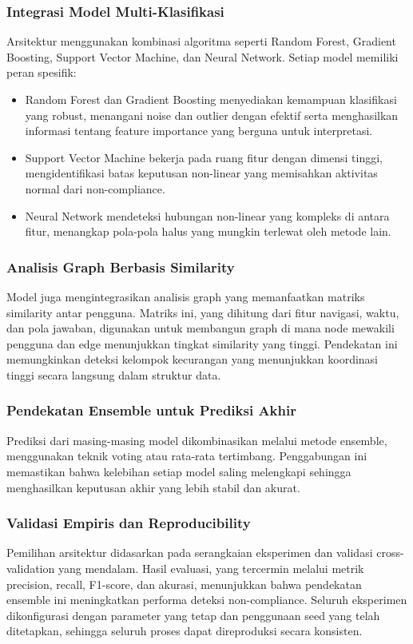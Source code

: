\subsubsection{Integrasi Model Multi-Klasifikasi}
Arsitektur menggunakan kombinasi algoritma seperti Random Forest, Gradient Boosting, Support Vector Machine, dan Neural Network. Setiap model memiliki peran spesifik:
\begin{itemize}
    \item Random Forest dan Gradient Boosting menyediakan kemampuan klasifikasi yang robust, menangani noise dan outlier dengan efektif serta menghasilkan informasi tentang feature importance yang berguna untuk interpretasi.
    \item Support Vector Machine bekerja pada ruang fitur dengan dimensi tinggi, mengidentifikasi batas keputusan non-linear yang memisahkan aktivitas normal dari non-compliance.
    \item Neural Network mendeteksi hubungan non-linear yang kompleks di antara fitur, menangkap pola-pola halus yang mungkin terlewat oleh metode lain.
\end{itemize}

\subsubsection{Analisis Graph Berbasis Similarity}
Model juga mengintegrasikan analisis graph yang memanfaatkan matriks similarity antar pengguna. Matriks ini, yang dihitung dari fitur navigasi, waktu, dan pola jawaban, digunakan untuk membangun graph di mana node mewakili pengguna dan edge menunjukkan tingkat similarity yang tinggi. Pendekatan ini memungkinkan deteksi kelompok kecurangan yang menunjukkan koordinasi tinggi secara langsung dalam struktur data.

\subsubsection{Pendekatan Ensemble untuk Prediksi Akhir}
Prediksi dari masing-masing model dikombinasikan melalui metode ensemble, menggunakan teknik voting atau rata-rata tertimbang. Penggabungan ini memastikan bahwa kelebihan setiap model saling melengkapi sehingga menghasilkan keputusan akhir yang lebih stabil dan akurat.

\subsubsection{Validasi Empiris dan Reproducibility}
Pemilihan arsitektur didasarkan pada serangkaian eksperimen dan validasi cross-validation yang mendalam. Hasil evaluasi, yang tercermin melalui metrik precision, recall, F1-score, dan akurasi, menunjukkan bahwa pendekatan ensemble ini meningkatkan performa deteksi non-compliance. Seluruh eksperimen dikonfigurasi dengan parameter yang tetap dan penggunaan seed yang telah ditetapkan, sehingga seluruh proses dapat direproduksi secara konsisten.

